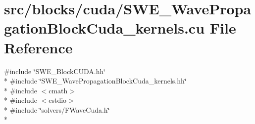 \hypertarget{SWE__WavePropagationBlockCuda__kernels_8cu}{\section{src/blocks/cuda/\-S\-W\-E\-\_\-\-Wave\-Propagation\-Block\-Cuda\-\_\-kernels.cu File Reference}
\label{SWE__WavePropagationBlockCuda__kernels_8cu}
}
{\ttfamily \#include \char`\"{}S\-W\-E\-\_\-\-Block\-C\-U\-D\-A.\-hh\char`\"{}}\\*
{\ttfamily \#include \char`\"{}S\-W\-E\-\_\-\-Wave\-Propagation\-Block\-Cuda\-\_\-kernels.\-hh\char`\"{}}\\*
{\ttfamily \#include $<$cmath$>$}\\*
{\ttfamily \#include $<$cstdio$>$}\\*
{\ttfamily \#include \char`\"{}solvers/\-F\-Wave\-Cuda.\-h\char`\"{}}\\*
